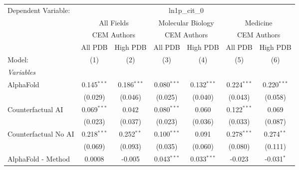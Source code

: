 \begingroup
\centering
\begin{tabular}{lcccccc}
   \tabularnewline \midrule \midrule
   Dependent Variable: & \multicolumn{6}{c}{ln1p\_cit\_0}\\
 & \multicolumn{2}{c}{All Fields} & \multicolumn{2}{c}{Molecular Biology} & \multicolumn{2}{c}{Medicine} \\
\cmidrule(lr){2-3} \cmidrule(lr){4-5} \cmidrule(lr){6-7}
 & \multicolumn{2}{c}{CEM Authors} & \multicolumn{2}{c}{CEM Authors} & \multicolumn{2}{c}{CEM Authors} \\
\cmidrule(lr){2-3} \cmidrule(lr){4-5} \cmidrule(lr){6-7}
 & \multicolumn{1}{c}{All PDB} & \multicolumn{1}{c}{High PDB} & \multicolumn{1}{c}{All PDB} & \multicolumn{1}{c}{High PDB} & \multicolumn{1}{c}{All PDB} & \multicolumn{1}{c}{High PDB} \\
\cmidrule(lr){2-2} \cmidrule(lr){3-3} \cmidrule(lr){4-4} \cmidrule(lr){5-5} \cmidrule(lr){6-6} \cmidrule(lr){7-7}
   Model:                                                     & (1)           & (2)           & (3)           & (4)           & (5)           & (6)\\  
   \midrule
   \emph{Variables}\\
   AlphaFold                                                  & 0.145$^{***}$ & 0.186$^{***}$ & 0.080$^{***}$ & 0.132$^{***}$ & 0.224$^{***}$ & 0.220$^{***}$\\   
                                                              & (0.029)       & (0.046)       & (0.025)       & (0.040)       & (0.043)       & (0.058)\\   
   Counterfactual AI                                          & 0.069$^{***}$ & 0.042         & 0.080$^{***}$ & 0.060         & 0.122$^{***}$ & 0.069\\   
                                                              & (0.023)       & (0.037)       & (0.023)       & (0.036)       & (0.033)       & (0.087)\\   
   Counterfactual No AI                                       & 0.218$^{***}$ & 0.252$^{**}$  & 0.100$^{***}$ & 0.091         & 0.278$^{***}$ & 0.274$^{**}$\\   
                                                              & (0.069)       & (0.093)       & (0.035)       & (0.060)       & (0.080)       & (0.111)\\   
   AlphaFold - Method                                         & 0.0008        & -0.005        & 0.043$^{***}$ & 0.033$^{***}$ & -0.023        & -0.031$^{*}$\\   

\end{tabular}
